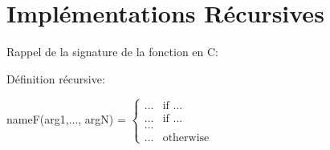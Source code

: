 \section{Implémentations Récursives}\label{recursivite}

Rappel de la signature de la fonction en C: 


Définition récursive:

nameF(arg1,..., argN) = $            
                \begin{cases}
                    ... & \text{if } ... \\
                    ... & \text{if } ... \\
                            ...          \\
                    ... & \text{otherwise}
                \end{cases} $


